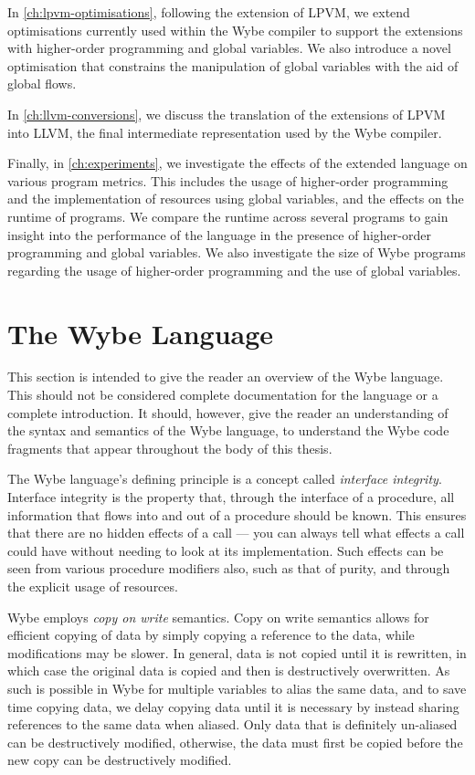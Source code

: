 In \cref{ch:lpvm-optimisations}, following the extension of LPVM, we extend optimisations currently used within the Wybe compiler to support the extensions with higher-order programming and global variables. We also introduce a novel optimisation that constrains the manipulation of global variables with the aid of global flows.

In \cref{ch:llvm-conversions}, we discuss the translation of the extensions of LPVM into LLVM, the final intermediate representation used by the Wybe compiler. 

Finally, in \cref{ch:experiments}, we investigate the effects of the extended language on various program metrics. This includes the usage of higher-order programming and the implementation of resources using global variables, and the effects on the runtime of programs. We compare the runtime across several programs to gain insight into the performance of the language in the presence of higher-order programming and global variables. We also investigate the size of Wybe programs regarding the usage of higher-order programming and the use of global variables.

\section{The Wybe Language}
\label{sec:wybe-lang}

This section is intended to give the reader an overview of the Wybe language. This should not be considered complete documentation for the language or a complete introduction. It should, however, give the reader an understanding of the syntax and semantics of the Wybe language, to understand the Wybe code fragments that appear throughout the body of this thesis.

The Wybe language's defining principle is a concept called \textit{interface integrity}. Interface integrity is the property that, through the interface of a procedure, all information that flows into and out of a procedure should be known. This ensures that there are no hidden effects of a call --- you can always tell what effects a call could have without needing to look at its implementation. Such effects can be seen from various procedure modifiers also, such as that of purity, and through the explicit usage of resources. 

Wybe employs \textit{copy on write} semantics. Copy on write semantics allows for efficient copying of data by simply copying a reference to the data, while modifications may be slower. In general, data is not copied until it is rewritten, in which case the original data is copied and then is destructively overwritten. As such is possible in Wybe for multiple variables to alias the same data, and to save time copying data, we delay copying data until it is necessary by instead sharing references to the same data when aliased. Only data that is definitely un-aliased can be destructively modified, otherwise, the data must first be copied before the new copy can be destructively modified.

